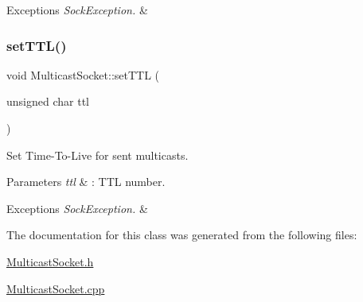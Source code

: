 \begin{DoxyExceptions}{Exceptions}
{\em Sock\+Exception.} & \\
\hline
\end{DoxyExceptions}
\mbox{\label{classMulticastSocket_abf3fae43ee2575adfc7c90ee31b1fc0a}} 
\subsubsection{\texorpdfstring{set\+T\+T\+L()}{setTTL()}}
{\footnotesize\ttfamily void Multicast\+Socket\+::set\+T\+TL (\begin{DoxyParamCaption}\item[{unsigned char}]{ttl }\end{DoxyParamCaption})}

Set Time-\/\+To-\/\+Live for sent multicasts. 
\begin{DoxyParams}{Parameters}
{\em ttl} & \+: T\+TL number. \\
\hline
\end{DoxyParams}

\begin{DoxyExceptions}{Exceptions}
{\em Sock\+Exception.} & \\
\hline
\end{DoxyExceptions}


The documentation for this class was generated from the following files\+:\begin{DoxyCompactItemize}
\item 
\hyperlink{MulticastSocket_8h}{Multicast\+Socket.\+h}\item 
\hyperlink{MulticastSocket_8cpp}{Multicast\+Socket.\+cpp}\end{DoxyCompactItemize}

